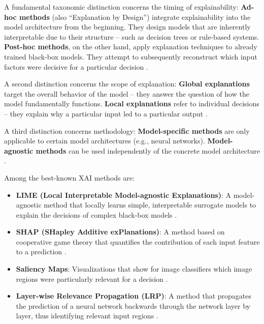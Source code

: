 \documentclass[
  12pt,
  a4paper,
  oneside,
  titlepage
]{article}
\begin{document}
A fundamental taxonomic distinction concerns the timing of 
explainability: \textbf{Ad-hoc methods} (also \enquote{Explanation by 
Design}) integrate explainability into the model architecture from the 
beginning. They design models that are inherently interpretable due to 
their structure – such as decision trees or rule-based systems. 
\textbf{Post-hoc methods}, on the other hand, apply explanation 
techniques to already trained black-box models. They attempt to 
subsequently reconstruct which input factors were decisive for a 
particular decision \citep[ p.~92]{BarredoArrieta2020}.

A second distinction concerns the scope of explanation: 
\textbf{Global explanations} target the overall behavior of the model 
– they answer the question of how the model fundamentally functions. 
\textbf{Local explanations} refer to individual decisions – they 
explain why a particular input led to a particular output 
\citep[ p.~80805]{Ortigossa2024}.

A third distinction concerns methodology: \textbf{Model-specific 
methods} are only applicable to certain model architectures (e.g., 
neural networks). \textbf{Model-agnostic methods} can be used 
independently of the concrete model architecture \citep[ p.~3]{Mersha2024}.

Among the best-known XAI methods are:

\begin{itemize}
    \item \textbf{LIME (Local Interpretable Model-agnostic Explanations)}: 
    A model-agnostic method that locally learns simple, interpretable 
    surrogate models to explain the decisions of complex black-box 
    models \citep[ p.~102]{BarredoArrieta2020}.
    
    \item \textbf{SHAP (SHapley Additive exPlanations)}: A method based 
    on cooperative game theory that quantifies the contribution of each 
    input feature to a prediction \citep[ p.~104]{BarredoArrieta2020}.
    
    \item \textbf{Saliency Maps}: Visualizations that show for image 
    classifiers which image regions were particularly relevant for a 
    decision \citep{Zhou2019}.
    
    \item \textbf{Layer-wise Relevance Propagation (LRP)}: A method that 
    propagates the prediction of a neural network backwards through the 
    network layer by layer, thus identifying relevant input regions 
    \citep{Montavon2019}.
\end{itemize}
\end{document}
